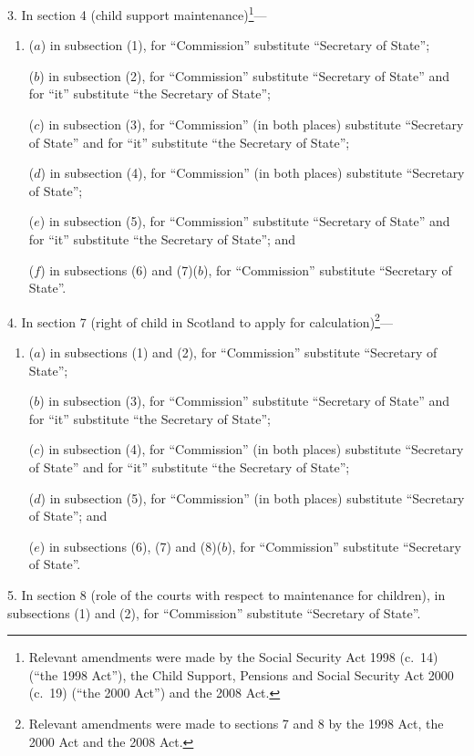 \documentclass[12pt,a4paper]{article}
\begin{document}
\medskip

3.  In section 4 (child support maintenance)\footnote{Relevant amendments were made by the Social Security Act 1998 (c.~14) (“the 1998 Act”), the Child Support, Pensions and Social Security Act 2000 (c.~19) (“the 2000 Act”) and the 2008 Act.}—
\begin{enumerate}\item[]
($a$) in subsection (1), for “Commission” substitute “Secretary of State”;

($b$) in subsection (2), for “Commission” substitute “Secretary of State” and for “it” substitute “the Secretary of State”;

($c$) in subsection (3), for “Commission” (in both places) substitute “Secretary of State” and for “it” substitute “the Secretary of State”;

($d$) in subsection (4), for “Commission” (in both places) substitute “Secretary of State”;

($e$) in subsection (5), for “Commission” substitute “Secretary of State” and for “it” substitute “the Secretary of State”; and

($f$) in subsections (6) and (7)($b$), for “Commission” substitute “Secretary of State”.
\end{enumerate}

\medskip

4.  In section 7 (right of child in Scotland to apply for calculation)\footnote{Relevant amendments were made to sections 7 and 8 by the 1998 Act, the 2000 Act and the 2008 Act.}—
\begin{enumerate}\item[]
($a$) in subsections (1) and (2), for “Commission” substitute “Secretary of State”;

($b$) in subsection (3), for “Commission” substitute “Secretary of State” and for “it” substitute “the Secretary of State”;

($c$) in subsection (4), for “Commission” (in both places) substitute “Secretary of State” and for “it” substitute “the Secretary of State”;

($d$) in subsection (5), for “Commission” (in both places) substitute “Secretary of State”; and

($e$) in subsections (6), (7) and (8)($b$), for “Commission” substitute “Secretary of State”.
\end{enumerate}

\medskip

5.  In section 8 (role of the courts with respect to maintenance for children), in subsections (1) and (2), for “Commission” substitute “Secretary of State”.
\end{document}
